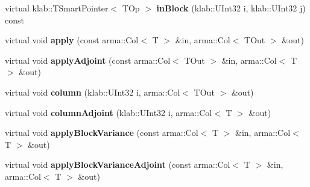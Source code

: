 \begin{DoxyCompactItemize}
\item 
virtual klab\+::\+T\+Smart\+Pointer$<$ T\+Op $>$ {\bfseries in\+Block} (klab\+::\+U\+Int32 i, klab\+::\+U\+Int32 j) const \hypertarget{classkl1p_1_1TBlockTridiagonalOperator_af25114ddcc9bcf6361898823c8c84bed}{}\label{classkl1p_1_1TBlockTridiagonalOperator_af25114ddcc9bcf6361898823c8c84bed}

\item 
virtual void {\bfseries apply} (const arma\+::\+Col$<$ T $>$ \&in, arma\+::\+Col$<$ T\+Out $>$ \&out)\hypertarget{classkl1p_1_1TBlockTridiagonalOperator_a1fe3f41ec6f514ca3557e91a157339bd}{}\label{classkl1p_1_1TBlockTridiagonalOperator_a1fe3f41ec6f514ca3557e91a157339bd}

\item 
virtual void {\bfseries apply\+Adjoint} (const arma\+::\+Col$<$ T\+Out $>$ \&in, arma\+::\+Col$<$ T $>$ \&out)\hypertarget{classkl1p_1_1TBlockTridiagonalOperator_a52c61b719ed8123a6f0bd63a17077bc8}{}\label{classkl1p_1_1TBlockTridiagonalOperator_a52c61b719ed8123a6f0bd63a17077bc8}

\item 
virtual void {\bfseries column} (klab\+::\+U\+Int32 i, arma\+::\+Col$<$ T\+Out $>$ \&out)\hypertarget{classkl1p_1_1TBlockTridiagonalOperator_afc94e82c8434e715017709cab88de987}{}\label{classkl1p_1_1TBlockTridiagonalOperator_afc94e82c8434e715017709cab88de987}

\item 
virtual void {\bfseries column\+Adjoint} (klab\+::\+U\+Int32 i, arma\+::\+Col$<$ T $>$ \&out)\hypertarget{classkl1p_1_1TBlockTridiagonalOperator_a11283192c9b22f0113da7a6cc5472f81}{}\label{classkl1p_1_1TBlockTridiagonalOperator_a11283192c9b22f0113da7a6cc5472f81}

\item 
virtual void {\bfseries apply\+Block\+Variance} (const arma\+::\+Col$<$ T $>$ \&in, arma\+::\+Col$<$ T $>$ \&out)\hypertarget{classkl1p_1_1TBlockTridiagonalOperator_a47aa5c4177cfb0c9ea194cfaa7b93cd1}{}\label{classkl1p_1_1TBlockTridiagonalOperator_a47aa5c4177cfb0c9ea194cfaa7b93cd1}

\item 
virtual void {\bfseries apply\+Block\+Variance\+Adjoint} (const arma\+::\+Col$<$ T $>$ \&in, arma\+::\+Col$<$ T $>$ \&out)\hypertarget{classkl1p_1_1TBlockTridiagonalOperator_ae3b88a97c3f8449b3176ecfc1486649f}{}\label{classkl1p_1_1TBlockTridiagonalOperator_ae3b88a97c3f8449b3176ecfc1486649f}

\end{DoxyCompactItemize}
